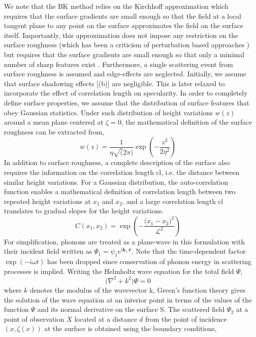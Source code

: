 We note that the BK method relies on the Kirchhoff approximation which requires that the surface gradients are small enough so that the field at a local tangent plane to any point on the surface approximates the field on the surface itself. Importantly, this approximation does not impose any restriction on the surface roughness (which has been a criticism of perturbation based approaches \cite{RN83}) but requires that the surface gradients are small enough so that only a minimal number of sharp features exist \cite{book_Beckmann}. Furthermore, a single scattering event from surface roughness is assumed and edge-effects are neglected. Initially, we assume that surface shadowing effects [(b)] are negligible. This is later relaxed to incorporate the effect of correlation length on specularity. In order to completely define surface properties, we assume that the distribution of surface features that obey Gaussian statistics. Under such distribution of height variations $w(z)$ around a mean plane centered at $\zeta=0$, the mathematical definition of the surface roughness can be extracted from,
\begin{equation}\label{eq:ch2-2}
w\left(z\right)=\frac{1}{\eta\sqrt(2\pi)}\exp\left(-\frac{z^2}{2\eta^2}\right)	
\end{equation}
In addition to surface roughness, a complete description of the surface also requires the information on the correlation length \gls{cl}, i.e. the distance between similar height variations. For a Gaussian distribution, the auto-correlation function enables a mathematical definition of correlation length between two repeated height variations at $x_1$ and $x_2$, and a large correlation length \gls{cl} translates to gradual slopes for the height variations. 
\begin{equation}\label{eq:ch2-31}
C\left(x_1,x_2\right)=\exp\left(-\frac{({x_1-x_2)}^2}{\mathcal{L}^2}\right)                                                  
\end{equation}
For simplification, phonons are treated as a plane-wave in this formulation with their incident field written as $\Psi_1=\psi_1e^{i\mathbf{k}_1.\mathbf{r}}$. Note that the time-dependent factor $\exp(-i\omega t)$ has been dropped since conservation of phonon energy in scattering processes is implied. Writing the Helmholtz wave equation for the total field $\Psi$,
\begin{equation}\label{eq:ch2-3}
{(\nabla}^2+k^2)\Psi=0
\end{equation}
where $k$ denotes the modulus of the wavevector \gls{k}, Green’s function theory gives the solution of the wave equation at an interior point in terms of the values of the function $\Psi$ and its normal derivative on the surface S. The scattered field $\Psi_2$ at a point of observation $X$ located at a distance $d$ from the point of incidence $(x,\zeta\left(x\right))$ at the surface is obtained using the boundary conditions, 
